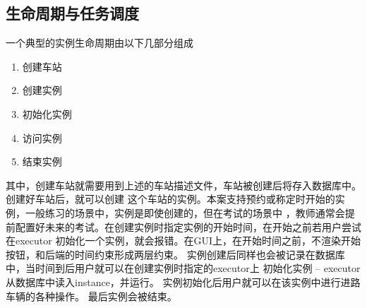 \subsection{生命周期与任务调度}
一个典型的实例生命周期由以下几部分组成
\begin{enumerate}
    \item 创建车站
    \item 创建实例
    \item 初始化实例
    \item 访问实例
    \item 结束实例
\end{enumerate}
其中，创建车站就需要用到上述的车站描述文件，车站被创建后将存入数据库中。创建好车站后，就可以创建
这个车站的实例。本案支持预约或称定时开始的实例，一般练习的场景中，实例是即使创建的，但在考试的场景中
，教师通常会提前配置好未来的考试。在创建实例时指定实例的开始时间，在开始之前若用户尝试在executor
初始化一个实例，就会报错。在GUI上，在开始时间之前，不渲染开始按钮，和后端的时间约束形成两层约束。
实例创建后同样也会被记录在数据库中，当时间到后用户就可以在创建实例时指定的executor上
初始化实例 -- executor从数据库中读入instance，并运行。
实例初始化后用户就可以在该实例中进行进路车辆的各种操作。
最后实例会被结束。

